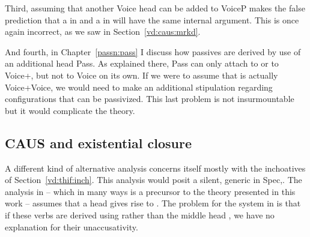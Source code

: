 \begin{exe}
\begin{xlist}
\begin{xlist}
\begin{exe}
\begin{exe}
\begin{xlist}
\begin{exe}
\begin{xlist}
\begin{exe}
\begin{xlist}
\begin{xlist}
\begin{exe}
\begin{xlist}
\begin{exe}
\begin{xlist}
\begin{exe}
\begin{exe}
\begin{exe}
\begin{xlist}
\begin{exe}
\begin{exe}
\begin{xlist}
\begin{xlist}
\begin{exe}
\begin{xlist}
\begin{exe}
\begin{exe}
\begin{exe}
\begin{xlist}
\begin{exe}
\begin{exe}
\begin{xlist}
\begin{exe}
\begin{xlist}
\begin{exe}
\begin{xlist}
\begin{exe}
\begin{xlist}
\begin{exe}
\begin{exe}
\begin{xlist}
\begin{exe}
\begin{exe}
\begin{xlist}
\begin{xlist}
\begin{exe}
\begin{xlist}
\begin{xlist}
\begin{exe}
\begin{xlist}
\begin{exe}
\begin{xlist}
\begin{exe}
\begin{xlist}
\begin{exe}
\begin{xlist}
\begin{exe}
\begin{exe}
\begin{exe}
\begin{exe}
\begin{xlist}
\begin{exe}
\begin{exe}
\begin{xlist}
\begin{xlist}
\begin{exe}
\begin{exe}
\begin{xlist}
\begin{exe}
\begin{xlist}
Third, assuming that another Voice head can be added to VoiceP makes the false prediction that a  in {\tkal} and a  in {\thif} will have the same internal argument. This is once again incorrect, as we saw in Section~\ref{vd:caus:mrkd}.

And fourth, in Chapter~\ref{passn:pass} I discuss how passives are derived by use of an additional head Pass. As explained there, Pass can only attach to {\vd} or to Voice+{\va}, but not to Voice on its own. If we were to assume that {\vd} is actually Voice+Voice, we would need to make an additional stipulation regarding configurations that can be passivized. This last problem is not insurmountable but it would complicate the theory.

	
	\subsection{CAUS and existential closure} \label{vd:others:ed}
A different kind of alternative analysis concerns itself mostly with the inchoatives of Section~\ref{vd:thif:inch}. This analysis would posit a silent, generic  in Spec,{\vd}. The analysis in \citet[61]{doron03} -- which in many ways is a precursor to the theory presented in this work -- assumes that a  head  gives rise to {\thif}. The problem for the system in \cite{doron03} is that if these verbs are derived using  rather than the middle head , we have no explanation for their unaccusativity.


\end{xlist}
\end{exe}
\end{xlist}
\end{exe}
\end{exe}
\end{xlist}
\end{xlist}
\end{exe}
\end{exe}
\end{xlist}
\end{exe}
\end{exe}
\end{exe}
\end{exe}
\end{xlist}
\end{exe}
\end{xlist}
\end{exe}
\end{xlist}
\end{exe}
\end{xlist}
\end{exe}
\end{xlist}
\end{xlist}
\end{exe}
\end{xlist}
\end{xlist}
\end{exe}
\end{exe}
\end{xlist}
\end{exe}
\end{exe}
\end{xlist}
\end{exe}
\end{xlist}
\end{exe}
\end{xlist}
\end{exe}
\end{xlist}
\end{exe}
\end{exe}
\end{xlist}
\end{exe}
\end{exe}
\end{exe}
\end{xlist}
\end{exe}
\end{xlist}
\end{xlist}
\end{exe}
\end{exe}
\end{xlist}
\end{exe}
\end{exe}
\end{exe}
\end{xlist}
\end{exe}
\end{xlist}
\end{exe}
\end{xlist}
\end{xlist}
\end{exe}
\end{xlist}
\end{exe}
\end{xlist}
\end{exe}
\end{exe}
\end{xlist}
\end{xlist}
\end{exe}

